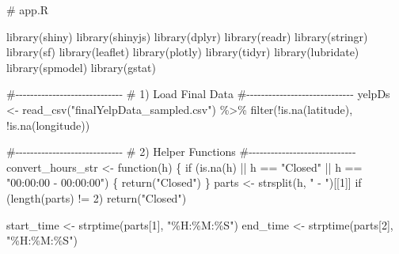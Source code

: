 \documentclass[
  12pt,
  letterpaper,
  DIV=11,
  numbers=noendperiod]{scrartcl}
\newenvironment{Shaded}{\begin{snugshade}}{\end{snugshade}}
\newcommand{\CommentTok}[1]{\textcolor[rgb]{0.42,0.45,0.49}{#1}}
\newcommand{\ControlFlowTok}[1]{\textcolor[rgb]{0.98,0.46,0.51}{#1}}
\newcommand{\DecValTok}[1]{\textcolor[rgb]{0.47,0.72,1.00}{#1}}
\newcommand{\FunctionTok}[1]{\textcolor[rgb]{0.70,0.57,0.94}{#1}}
\newcommand{\NormalTok}[1]{\textcolor[rgb]{0.88,0.89,0.91}{#1}}
\newcommand{\OtherTok}[1]{\textcolor[rgb]{0.70,0.57,0.94}{#1}}
\newcommand{\SpecialCharTok}[1]{\textcolor[rgb]{0.47,0.72,1.00}{#1}}
\newcommand{\StringTok}[1]{\textcolor[rgb]{0.62,0.80,1.00}{#1}}
\begin{document}
\begin{Shaded}
\begin{Highlighting}[]
\CommentTok{\# app.R}

\FunctionTok{library}\NormalTok{(shiny)}
\FunctionTok{library}\NormalTok{(shinyjs)}
\FunctionTok{library}\NormalTok{(dplyr)}
\FunctionTok{library}\NormalTok{(readr)}
\FunctionTok{library}\NormalTok{(stringr)}
\FunctionTok{library}\NormalTok{(sf)}
\FunctionTok{library}\NormalTok{(leaflet)}
\FunctionTok{library}\NormalTok{(plotly)}
\FunctionTok{library}\NormalTok{(tidyr)}
\FunctionTok{library}\NormalTok{(lubridate)}
\FunctionTok{library}\NormalTok{(spmodel)}
\FunctionTok{library}\NormalTok{(gstat)}

\CommentTok{\#{-}{-}{-}{-}{-}{-}{-}{-}{-}{-}{-}{-}{-}{-}{-}{-}{-}{-}{-}{-}{-}{-}{-}{-}{-}{-}{-}{-}{-}}
\CommentTok{\# 1) Load Final Data}
\CommentTok{\#{-}{-}{-}{-}{-}{-}{-}{-}{-}{-}{-}{-}{-}{-}{-}{-}{-}{-}{-}{-}{-}{-}{-}{-}{-}{-}{-}{-}{-}}
\NormalTok{yelpDs }\OtherTok{\textless{}{-}} \FunctionTok{read\_csv}\NormalTok{(}\StringTok{"finalYelpData\_sampled.csv"}\NormalTok{) }\SpecialCharTok{\%\textgreater{}\%}
  \FunctionTok{filter}\NormalTok{(}\SpecialCharTok{!}\FunctionTok{is.na}\NormalTok{(latitude), }\SpecialCharTok{!}\FunctionTok{is.na}\NormalTok{(longitude))}

\CommentTok{\#{-}{-}{-}{-}{-}{-}{-}{-}{-}{-}{-}{-}{-}{-}{-}{-}{-}{-}{-}{-}{-}{-}{-}{-}{-}{-}{-}{-}{-}}
\CommentTok{\# 2) Helper Functions}
\CommentTok{\#{-}{-}{-}{-}{-}{-}{-}{-}{-}{-}{-}{-}{-}{-}{-}{-}{-}{-}{-}{-}{-}{-}{-}{-}{-}{-}{-}{-}{-}}
\NormalTok{convert\_hours\_str }\OtherTok{\textless{}{-}} \ControlFlowTok{function}\NormalTok{(h) \{}
  \ControlFlowTok{if}\NormalTok{ (}\FunctionTok{is.na}\NormalTok{(h) }\SpecialCharTok{||}\NormalTok{ h }\SpecialCharTok{==} \StringTok{"Closed"} \SpecialCharTok{||}\NormalTok{ h }\SpecialCharTok{==} \StringTok{"00:00:00 {-} 00:00:00"}\NormalTok{) \{}
    \FunctionTok{return}\NormalTok{(}\StringTok{"Closed"}\NormalTok{)}
\NormalTok{  \}}
\NormalTok{  parts }\OtherTok{\textless{}{-}} \FunctionTok{strsplit}\NormalTok{(h, }\StringTok{" {-} "}\NormalTok{)[[}\DecValTok{1}\NormalTok{]]}
  \ControlFlowTok{if}\NormalTok{ (}\FunctionTok{length}\NormalTok{(parts) }\SpecialCharTok{!=} \DecValTok{2}\NormalTok{) }\FunctionTok{return}\NormalTok{(}\StringTok{"Closed"}\NormalTok{)}
  
\NormalTok{  start\_time }\OtherTok{\textless{}{-}} \FunctionTok{strptime}\NormalTok{(parts[}\DecValTok{1}\NormalTok{], }\StringTok{"\%H:\%M:\%S"}\NormalTok{)}
\NormalTok{  end\_time   }\OtherTok{\textless{}{-}} \FunctionTok{strptime}\NormalTok{(parts[}\DecValTok{2}\NormalTok{], }\StringTok{"\%H:\%M:\%S"}\NormalTok{)}
  

\end{Highlighting}
\end{Shaded}
\end{document}
